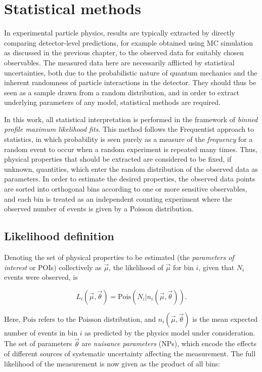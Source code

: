 \chapter{Statistical methods}
\label{ch:stat}

In experimental particle physics, results are typically extracted by directly comparing detector-level predictions, for example obtained using MC simulation as discussed in the previous chapter, to the observed data for suitably chosen observables. The measured data here are necessarily afflicted by statistical uncertainties, both due to the probabilistic nature of quantum mechanics and the inherent randomness of particle interactions in the detector. They should thus be seen as a sample drawn from a random distribution, and in order to extract underlying parameters of any model, statistical methods are required.

In this work, all statistical interpretation is performed in the framework of \textit{binned profile maximum likelihood fits}. This method follows the Frequentist approach to statistics, in which probability is seen purely as a measure of the \textit{frequency} for a random event to occur when a random experiment is repeated many times.
Thus, physical properties that should be extracted are considered to be fixed, if unknown, quantities, which enter the random distribution of the observed data as parameters. In order to estimate the desired properties, the observed data points are sorted into orthogonal bins according to one or more sensitive observables, and each bin is treated as an independent counting experiment where the observed number of events is given by a Poisson distribution. 

\section{Likelihood definition}
Denoting the set of physical properties to be estimated (the \textit{parameters of interest} or POIs) collectively as $\vec{\mu}$, the likelihood of $\vec{\mu}$ for bin $i$, given that $N_i$ events were observed, is~\cite{Cowan:2010js}

\begin{equation}
    L_i (\vec{\mu}, \vec{\theta}) = \mathrm{Pois} \left(N_i | n_i (\vec{\mu}, \vec{\theta}) \right).
\end{equation}

Here, $\mathrm{Pois}$ refers to the Poisson distribution, and $n_i (\vec{\mu}, \vec{\theta})$ is the mean expected number of events in bin $i$ as predicted by the physics model under consideration. The set of parameters $\vec{\theta}$ are \textit{nuisance parameters} (NPs), which encode the effects of different sources of systematic uncertainty affecting the measurement. The full likelihood of the measurement is now given as the product of all bins:

